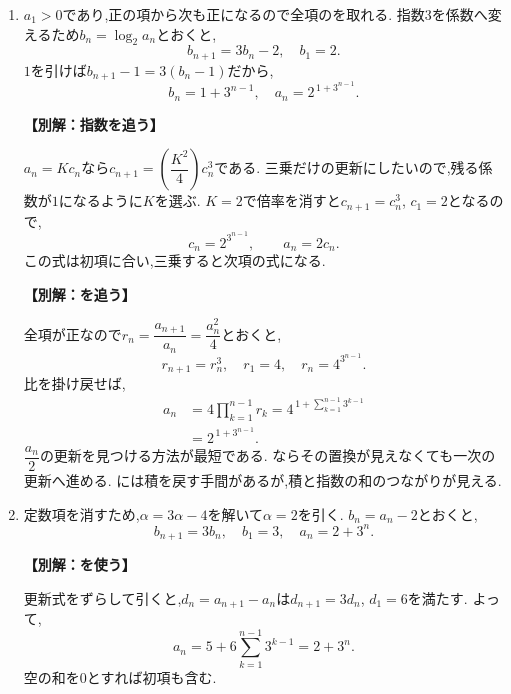 \begin{enumerate}[label=\textbf{問\arabic*.},leftmargin=3.8em,format=\bookitemlink{practice-basic}{solution}{problem}]
          \item $a_1>0$であり,正の項から次も正になるので全項のを取れる.
                  指数$3$を係数へ変えるため$b_n=\log_2a_n$とおくと,
                  \[
                    b_{n+1}=3b_n-2,\quad b_1=2.
                  \]
                  $1$を引けば$b_{n+1}-1=3(b_n-1)$だから,
                  \[
                    b_n=1+3^{n-1},\quad a_n=2^{\,1+3^{n-1}}.
                  \]
                  \par\smallskip\noindent\textbf{【別解：指数を追う】}\par
                  $a_n=Kc_n$なら$c_{n+1}=\left(\dfrac{K^2}{4}\right)c_n^3$である.
                  三乗だけの更新にしたいので,残る係数が$1$になるように$K$を選ぶ.
                  $K=2$で倍率を消すと$c_{n+1}=c_n^3$, $c_1=2$となるので,
                  \[
                    c_n=2^{3^{n-1}},\qquad a_n=2c_n.
                  \]
                  この式は初項に合い,三乗すると次項の式になる.
                  \par\smallskip\noindent\textbf{【別解：を追う】}\par
                  全項が正なので$r_n=\dfrac{a_{n+1}}{a_n}=\dfrac{a_n^2}{4}$とおくと,
                  \[
                    r_{n+1}=r_n^3,\quad r_1=4,\quad r_n=4^{3^{n-1}}.
                  \]
                  比を掛け戻せば,
                  \[
                  \begin{aligned}
                    a_n&=4\prod_{k=1}^{n-1}r_k
                       =4^{\,1+\sum_{k=1}^{n-1}3^{k-1}}\\
                       &=2^{\,1+3^{n-1}}.
                  \end{aligned}
                  \]
                  $\dfrac{a_n}{2}$の更新を見つける方法が最短である.
                  ならその置換が見えなくても一次の更新へ進める.
                  には積を戻す手間があるが,積と指数の和のつながりが見える.

          \item 定数項を消すため,$\alpha=3\alpha-4$を解いて$\alpha=2$を引く.
                  $b_n=a_n-2$とおくと,
                  \[
                    b_{n+1}=3b_n,\quad b_1=3,\quad a_n=2+3^n.
                  \]
                  \par\smallskip\noindent\textbf{【別解：を使う】}\par
                  更新式をずらして引くと,$d_n=a_{n+1}-a_n$は$d_{n+1}=3d_n$, $d_1=6$を満たす.
                  よって,
                  \[
                    a_n=5+6\sum_{k=1}^{n-1}3^{k-1}=2+3^n.
                  \]
                  空の和を$0$とすれば初項も含む.


\end{enumerate}
